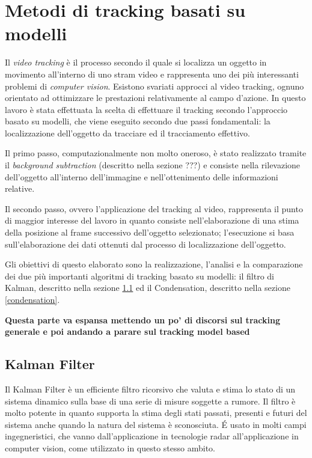 \section{Metodi di tracking basati su modelli} \label{modelTracking}
Il \textit{video tracking} è il processo secondo il quale si localizza un oggetto in movimento all'interno di uno stram video e rappresenta uno dei più interessanti problemi di \textit{computer vision}. Esistono svariati approcci al video tracking, ognuno orientato ad ottimizzare le prestazioni relativamente al campo d'azione. In questo lavoro è stata effettuata la scelta di effettuare il tracking secondo l'approccio basato su modelli, che viene eseguito secondo due passi fondamentali: la localizzazione dell'oggetto da tracciare ed il tracciamento effettivo.

Il primo passo, computazionalmente non molto oneroso, è stato realizzato tramite il \textit{background subtraction} (descritto nella sezione ???) e consiste nella rilevazione dell'oggetto all'interno dell'immagine e nell'ottenimento delle informazioni relative.

Il secondo passo, ovvero l'applicazione del tracking al video, rappresenta il punto di maggior interesse del lavoro in quanto consiste nell'elaborazione di una stima della posizione al frame successivo dell'oggetto selezionato; l'esecuzione si basa sull'elaborazione dei dati ottenuti dal processo di localizzazione dell'oggetto.

Gli obiettivi di questo elaborato sono la realizzazione, l'analisi e la comparazione dei due più importanti algoritmi di tracking basato su modelli: il filtro di Kalman, descritto nella sezione \ref{kalman} ed il Condensation, descritto nella sezione \ref{condensation}.

\textbf{Questa parte va espansa mettendo un po' di discorsi sul tracking generale e poi andando a parare sul tracking model based}

\subsection{Kalman Filter}\label{kalman}
Il Kalman Filter\cite{kalman-intro} è un efficiente filtro ricorsivo che valuta e stima lo stato di un sistema dinamico sulla base di una serie di misure soggette a rumore. Il filtro è molto potente in quanto supporta la stima degli stati passati, presenti e futuri del sistema anche quando la natura del sistema è sconosciuta. \'E usato in molti campi ingegneristici, che vanno dall'applicazione in tecnologie radar all'applicazione in computer vision, come utilizzato in questo stesso ambito.
